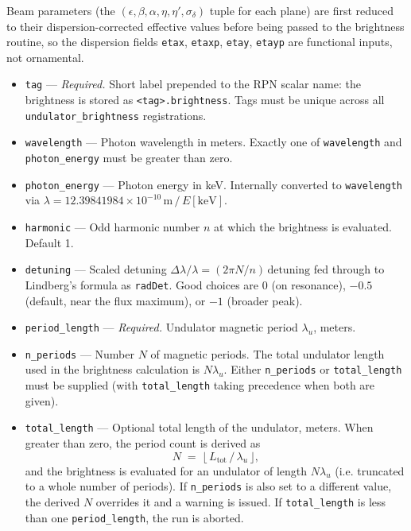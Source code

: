 \documentclass[11pt]{article}
\begin{document}
Beam parameters (the $(\epsilon, \beta, \alpha, \eta, \eta', \sigma_\delta)$
tuple for each plane) are first reduced to their dispersion-corrected
effective values before being passed to the brightness routine, so the
dispersion fields \verb|etax|, \verb|etaxp|, \verb|etay|, \verb|etayp|
are functional inputs, not ornamental.

\begin{itemize}

\item \verb|tag| --- {\em Required.}  Short label prepended to the RPN
        scalar name: the brightness is stored as \verb|<tag>.brightness|.
        Tags must be unique across all \verb|undulator_brightness|
        registrations.

\item \verb|wavelength| --- Photon wavelength in meters.  Exactly one
        of \verb|wavelength| and \verb|photon_energy| must be greater
        than zero.

\item \verb|photon_energy| --- Photon energy in keV.  Internally
        converted to \verb|wavelength| via $\lambda = 12.39841984 \times
        10^{-10}\,\textrm{m}\,/\,E[\textrm{keV}]$.

\item \verb|harmonic| --- Odd harmonic number $n$ at which the brightness
        is evaluated.  Default 1.

\item \verb|detuning| --- Scaled detuning $\Delta\lambda / \lambda =
        (2\pi N/n)\,\textrm{detuning}$ fed through to Lindberg's formula
        as \verb|radDet|.  Good choices are $0$ (on resonance),
        $-0.5$ (default, near the flux maximum), or $-1$ (broader peak).

\item \verb|period_length| --- {\em Required.}  Undulator magnetic
        period $\lambda_u$, meters.

\item \verb|n_periods| --- Number $N$ of magnetic periods.  The total
        undulator length used in the brightness calculation is
        $N\lambda_u$.  Either \verb|n_periods| or \verb|total_length|
        must be supplied (with \verb|total_length| taking precedence
        when both are given).

\item \verb|total_length| --- Optional total length of the undulator,
        meters.  When greater than zero, the period count is derived as
\begin{equation}
N \;=\; \lfloor \, L_{\textrm{tot}} \, / \, \lambda_u \, \rfloor,
\end{equation}
        and the brightness is evaluated for an undulator of length
        $N\lambda_u$ (i.e. truncated to a whole number of periods).
        If \verb|n_periods| is also set to a different value, the
        derived $N$ overrides it and a warning is issued.  If
        \verb|total_length| is less than one \verb|period_length|, the
        run is aborted.


\end{itemize}
\end{document}
